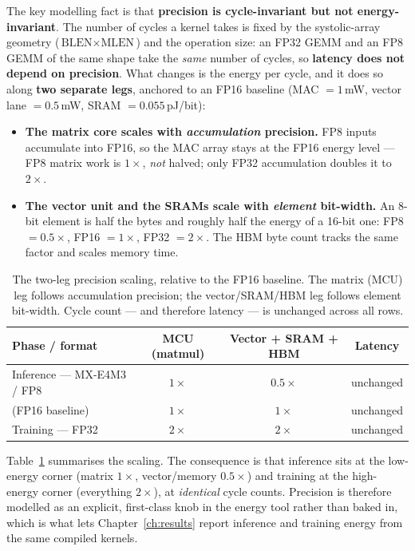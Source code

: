 \documentclass[11pt]{report}
\begin{document}
The key modelling fact is that \textbf{precision is cycle-invariant but not
energy-invariant}. The number of cycles a kernel takes is fixed by the
systolic-array geometry ($\text{BLEN}\times\text{MLEN}$) and the operation
size: an FP32 GEMM and an FP8 GEMM of the same shape take the \emph{same}
number of cycles, so \textbf{latency does not depend on precision}. What
changes is the energy per cycle, and it does so along \textbf{two separate
legs}, anchored to an FP16 baseline (MAC $=1$\,mW, vector lane $=0.5$\,mW,
SRAM $=0.055$\,pJ/bit):

\begin{itemize}
\item \textbf{The matrix core scales with \emph{accumulation} precision.}
FP8 inputs accumulate into FP16, so the MAC array stays at the FP16 energy
level --- FP8 matrix work is $1\times$, \emph{not} halved; only FP32
accumulation doubles it to $2\times$.
\item \textbf{The vector unit and the SRAMs scale with \emph{element}
bit-width.} An 8-bit element is half the bytes and roughly half the energy
of a 16-bit one: FP8 $=0.5\times$, FP16 $=1\times$, FP32 $=2\times$. The
HBM byte count tracks the same factor and scales memory time.
\end{itemize}

\begin{table}[t]
\centering
\caption{The two-leg precision scaling, relative to the FP16 baseline. The
matrix (MCU) leg follows accumulation precision; the vector/SRAM/HBM leg
follows element bit-width. Cycle count --- and therefore latency --- is
unchanged across all rows.}
\label{tab:precision}
\begin{tabular}{@{}lccc@{}}
\toprule
Phase / format & MCU (matmul) & Vector + SRAM + HBM & Latency \\
\midrule
Inference --- MX-E4M3 / FP8 & $1\times$ & $0.5\times$ & unchanged \\
(FP16 baseline) & $1\times$ & $1\times$ & unchanged \\
Training --- FP32 & $2\times$ & $2\times$ & unchanged \\
\bottomrule
\end{tabular}
\end{table}

Table~\ref{tab:precision} summarises the scaling. The consequence is that
inference sits at the low-energy corner (matrix $1\times$, vector/memory
$0.5\times$) and training at the high-energy corner (everything $2\times$),
at \emph{identical} cycle counts. Precision is therefore modelled as an
explicit, first-class knob in the energy tool rather than baked in, which
is what lets Chapter~\ref{ch:results} report inference and training energy
from the same compiled kernels.
\end{document}
